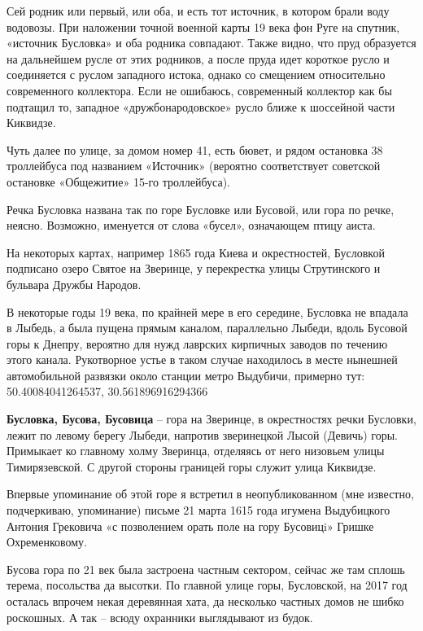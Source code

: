 Сей родник или первый, или оба, и есть тот источник, в котором брали воду водовозы. При наложении точной военной карты 19 века фон Руге на спутник, «источник Бусловка» и оба родника совпадают. Также видно, что пруд образуется на дальнейшем русле от этих родников, а после пруда идет короткое русло и соединяется с руслом западного истока, однако со смещением относительно современного коллектора. Если не ошибаюсь, современный коллектор как бы подтащил то, западное «дружбонародовское» русло ближе к шоссейной части Киквидзе.

Чуть далее по улице, за домом номер 41, есть бювет, и рядом остановка 38 троллейбуса под названием «Источник» (вероятно соответствует советской остановке «Общежитие» 15-го троллейбуса).

Речка Бусловка названа так по горе Бусловке или Бусовой, или гора по речке, неясно. Возможно, именуется от слова «бусел», означающем птицу аиста.

На некоторых картах, например 1865 года Киева и окрестностей, Бусловкой подписано озеро Святое на Зверинце, у перекрестка улицы Струтинского и бульвара Дружбы Народов.

В некоторые годы 19 века, по крайней мере в его середине, Бусловка не впадала в Лыбедь, а была пущена прямым каналом, параллельно Лыбеди, вдоль Бусовой горы к Днепру, вероятно для нужд лаврских кирпичных заводов по течению этого канала. Рукотворное устье в таком случае находилось в месте нынешней автомобильной развязки около станции метро Выдубичи, примерно тут:\\ 50.40084041264537, 30.561896916294366\\

\medskip

\textbf{Бусловка, Бусова, Бусовица} – гора на Зверинце, в окрестностях речки Бусловки, лежит по левому берегу Лыбеди, напротив зверинецкой Лысой (Девичь) горы. Примыкает ко главному холму Зверинца, отделяясь от него низовьем улицы Тимирязевской. С другой стороны границей горы служит улица Киквидзе. 

Впервые упоминание об этой горе я встретил в не\-опубликованном (мне известно, подчеркиваю, упоминание) письме 21 марта 1615 года игумена Выдубицкого Антония Грековича «с позволением орать поле на гору Бусовицi» Гришке Охременковому.

Бусова гора по 21 век была застроена частным сектором, сейчас же там сплошь терема, посольства да высотки. По главной улице горы, Бусловской, на 2017 год осталась впрочем некая деревянная хата, да несколько частных домов не шибко роскошных. А так – всюду охранники выглядывают из будок.

